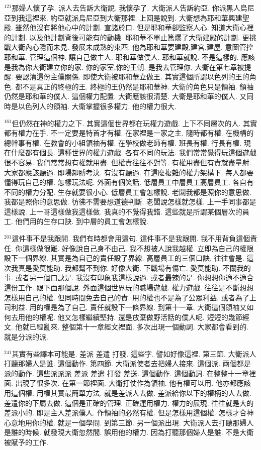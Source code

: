 \documentclass{book}
\begin{document}
$^{121}$那婦人懷了孕.
派人去告訴大衛說.
我懷孕了.
大衛派人告訴約亞.
你派黑人烏尼亞到我這裡來.
約亞就派烏尼亞到大衛那裡.
上回是說到.
大衛想為耶和華興建聖殿.
雖然他沒有將他心中的計劃.
宣諸於口.
但是耶和華卻監察人心.
知道大衛心裡的計劃.
以及他計劃背後可能有的動機.
耶和華不單止篤爆了大衛建殿的計劃.
更挑戰大衛內心隱而未見.
發展未成熟的東西.
他為耶和華要建殿,建宮,建屋.
意圖管控耶和華.
管理這個神.
讓自己做主人.
耶和華做僕人.
耶和華就說.
不是這樣的.
應該是我為你大衛建立你的家.
你的家室,你的王朝.
是我去管理你.
大衛在第七章被提醒.
要認清這份主僕關係.
即使大衛被耶和華立做王.
其實這個所謂以色列的王的角色.
都不是真正的終極的王.
終極的王仍然是耶和華神.
大衛的角色只是領袖.
領袖仍然是耶和華的僕人.
這個權力配置.
大衛應該很清楚.
大衛是耶和華的僕人.
又同時是以色列人的領袖.
大衛掌握很多權力.
他的權力很大.

$^{161}$但仍然在神的權力之下.
其實這個世界都在玩權力遊戲.
上下不同層次的人.
其實都有權力在手.
不一定要是特首才有權.
在家裡是一家之主.
隨時都有權.
在機構的總幹事有權.
在教會的小組領袖有權.
在學校做老師有權.
班長有權.
行長有權.
現在什麼都有個長.
這種世界的權力遊戲.
各有不同的玩法.
我們常常覺得玩這個遊戲很不容易.
我們常常想有權就用盡.
但權責往往不對等.
有權用盡但有責就盡量射.
大家都應該聽過.
即場卸膊考決.
有沒有聽過.
在這麼複雜的權力架構下.
每人都要懂得玩自己的權.
怎樣玩法呢.
外面有個笑話.
低層員工中層員工高層員工.
各自有不同的權力分配.
生存就要很小心.
低層員工會怎樣說.
老闆我都是照你的意思做.
我都是照你的意思做.
彷彿不需要想道德判斷.
老闆說怎樣就怎樣.
上一手同事都是這樣說.
上一哥這樣做我這樣做.
我真的不覺得我錯.
這些就是所謂某個層次的員工.
他們用的生存口訣.
到中層的員工會怎樣說.

$^{201}$這件事不是我跟開.
我們有時都會用這句.
這件事不是我跟開.
我不用背負這個責任.
你這樣做很難.
好像說自己身不由己.
我不想被人說我越權.
立即為自己的權限設下一個界線.
其實是為自己的責任設了界線.
高層員工的三個口訣.
往往會是.
這次我真是愛莫能助.
我都幫不到你.
好像大衛.
下戰場有傷亡.
愛莫能助.
不關我的事.
或者另一個口訣是.
我沒有印象我這樣說過.
或者最辣的是.
你想想你適不適合這份工作.
跟下面那個說.
外面這個世界玩的職場遊戲.
權力遊戲.
往往是不斷想想怎樣用自己的權.
但同時間免去自己的責.
用的權也不是為了公眾利益.
或者為了上司利益.
用的權是為了自己.
責任就設下一條界線.
到第十一章.
大衛這個領袖又如何去用他的權呢.
他又怎樣繼續堅持.
還是放棄做野活話的僕人呢.
短短的幾節經文.
他就已經亂來.
整個第十一章經文裡面.
多次出現一個動詞.
大家都會看到的.
就是分派的派.

$^{241}$其實有些譯本可能是.
差派 差遣 打發.
這些字.
譬如好像這裡.
第三節.
大衛派人打聽那婦人是誰.
這個動作.
第四節.
大衛派使者去把婦人接來.
這個派.
兩個都是派的動作.
這些派派派 差派 差遣 打發 差送.
這個動作.
這個動詞.
在整整十一章裡面.
出現了很多次.
在第一節裡面.
大衛打仗作為領袖.
他有權可以用.
他亦都應該用這個權.
用權其實最簡單方法.
就是差派人去做.
差派給你以下的權柄的人去做.
差遣你的下屬去做.
這個是正確的管理.
正確運用權力.
權力的展現.
往往就是大的差派小的.
即是主人差派僕人.
作領袖的必然有權.
但是怎樣用這個權.
怎樣才合神心意地用你的權.
就是一個學問.
到第三節.
另一個派出現.
大衛派人去打聽那婦人是誰的時候.
就發現大衛忽然間.
誤用他的權力.
因為打聽那個婦人是誰.
不是大衛被賦予的工作.
\end{document}

